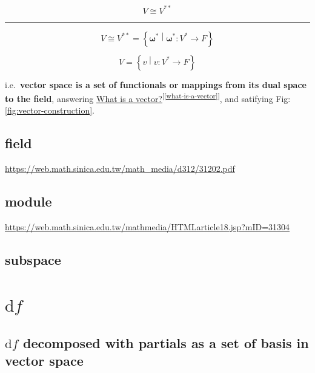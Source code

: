 \documentclass[
]{book}
\theoremstyle{definition}
\theoremstyle{definition}
\theoremstyle{definition}
\theoremstyle{definition}
\theoremstyle{remark}
\begin{document}
\[
V\cong V^{**}
\]

\begin{center}\rule{0.5\linewidth}{0.5pt}\end{center}

\[
V\cong V^{**}=\left\{ \boldsymbol{\omega}^{*}\middle|\boldsymbol{\omega}^{*}:V^{*}\rightarrow F\right\} 
\]

\[
V=\left\{ v\middle|v:V^{*}\rightarrow F\right\} 
\]

i.e.~\textbf{vector space is a set of functionals or mappings from its dual space to the field}, answering \protect\hyperlink{what-is-a-vector}{What is a vector?}\textsuperscript{{[}\ref{what-is-a-vector}{]}}, and satifying Fig: \ref{fig:vector-construction}.

\hypertarget{field}{%
\section{field}\label{field}}

\url{https://web.math.sinica.edu.tw/math_media/d312/31202.pdf}

\hypertarget{module}{%
\section{module}\label{module}}

\url{https://web.math.sinica.edu.tw/mathmedia/HTMLarticle18.jsp?mID=31304}

\hypertarget{subspace}{%
\section{subspace}\label{subspace}}

\hypertarget{mathrmdf}{%
\chapter{\texorpdfstring{\(\mathrm{d}f\)}{\textbackslash mathrm\{d\}f}}\label{mathrmdf}}

\hypertarget{mathrmdf-decomposed-with-partials-as-a-set-of-basis-in-vector-space}{%
\section{\texorpdfstring{\(\mathrm{d}f\) decomposed with partials as a set of basis in vector space}{\textbackslash mathrm\{d\}f decomposed with partials as a set of basis in vector space}}\label{mathrmdf-decomposed-with-partials-as-a-set-of-basis-in-vector-space}}
\end{document}
